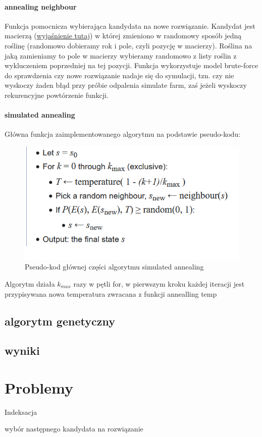 \documentclass[12pt,a4paper]{article}
\begin{document}
\paragraph{annealing neighbour}
Funkcja pomocnicza wybierająca kandydata na nowe rozwiązanie. Kandydat jest macierzą (\hyperref[postac_rozw]{wyjaśnienie tutaj}) w której zmieniono w randomowy sposób jedną roślinę (randomowo dobieramy rok i pole, czyli pozycję w macierzy). Roślina na jaką zamieniamy to pole w macierzy wybieramy randomowo z listy roślin z wykluczeniem poprzedniej na tej pozycji.
Funkcja wykorzystuje model brute-force do sprawdzenia czy nowe rozwiązanie nadaje się do symulacji, tzn. czy nie wyskoczy żaden błąd przy próbie odpalenia simulate farm, zaś jeżeli wyskoczy rekurencyjne powtórzenie funkcji. 

\paragraph{simulated annealing}
Główna funkcja zaimplementowanego algorytmu na podstawie pseudo-kodu:

\begin{figure}[H]
	\centering
	\includegraphics[width=1\linewidth]{screens/pseudocode}
	\caption{Pseudo-kod głównej części algorytmu simulated annealing}
	\label{fig:pseudocode}
\end{figure}


Algorytm działa $ k_{max} $ razy w pętli for, 
w pierwszym kroku każdej iteracji jest przypisywana nowa temperatura zwracana z funkcji annealling temp


\subsection{algorytm genetyczny}


\subsection{wyniki}





\section{Problemy}
Indeksacja

wybór następnego kandydata na rozwiązanie


	
\end{document}
